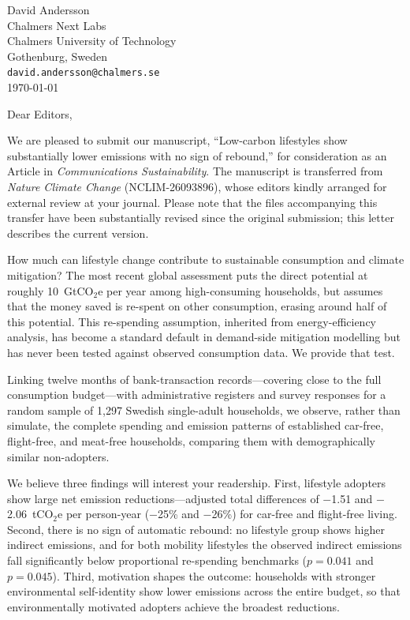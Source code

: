 \documentclass[12pt,a4paper]{article}
\begin{document}
\begin{flushright}
David Andersson\\
Chalmers Next Labs\\
Chalmers University of Technology\\
Gothenburg, Sweden\\[0.4em]
\texttt{david.andersson@chalmers.se}\\[1em]
\today
\end{flushright}

\bigskip

Dear Editors,

We are pleased to submit our manuscript, ``Low-carbon lifestyles show substantially lower emissions with no sign of rebound,'' for consideration as an Article in \textit{Communications Sustainability}. The manuscript is transferred from \textit{Nature Climate Change} (NCLIM-26093896), whose editors kindly arranged for external review at your journal. Please note that the files accompanying this transfer have been substantially revised since the original submission; this letter describes the current version.

How much can lifestyle change contribute to sustainable consumption and climate mitigation? The most recent global assessment puts the direct potential at roughly 10~GtCO$_2$e per year among high-consuming households, but assumes that the money saved is re-spent on other consumption, erasing around half of this potential. This re-spending assumption, inherited from energy-efficiency analysis, has become a standard default in demand-side mitigation modelling but has never been tested against observed consumption data. We provide that test.

Linking twelve months of bank-transaction records---covering close to the full consumption budget---with administrative registers and survey responses for a random sample of 1,297 Swedish single-adult households, we observe, rather than simulate, the complete spending and emission patterns of established car-free, flight-free, and meat-free households, comparing them with demographically similar non-adopters.

We believe three findings will interest your readership. First, lifestyle adopters show large net emission reductions---adjusted total differences of $-$1.51 and $-$2.06~tCO$_2$e per person-year ($-$25\% and $-$26\%) for car-free and flight-free living. Second, there is no sign of automatic rebound: no lifestyle group shows higher indirect emissions, and for both mobility lifestyles the observed indirect emissions fall significantly below proportional re-spending benchmarks ($p = 0.041$ and $p = 0.045$). Third, motivation shapes the outcome: households with stronger environmental self-identity show lower emissions across the entire budget, so that environmentally motivated adopters achieve the broadest reductions.
\end{document}
